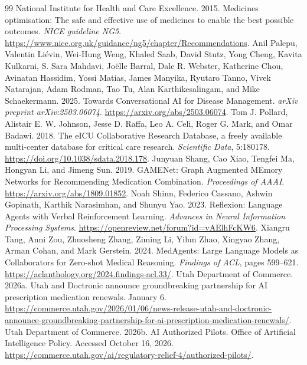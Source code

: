 \begin{thebibliography}{99}
 National Institute for Health and Care Excellence. 2015. Medicines optimisation: The safe and effective use of medicines to enable the best possible outcomes. \emph{NICE guideline NG5}. \url{https://www.nice.org.uk/guidance/ng5/chapter/Recommendations}.
 Anil Palepu, Valentin Li\'evin, Wei-Hung Weng, Khaled Saab, David Stutz, Yong Cheng, Kavita Kulkarni, S. Sara Mahdavi, Jo\"elle Barral, Dale R. Webster, Katherine Chou, Avinatan Hassidim, Yossi Matias, James Manyika, Ryutaro Tanno, Vivek Natarajan, Adam Rodman, Tao Tu, Alan Karthikesalingam, and Mike Schaekermann. 2025. Towards Conversational AI for Disease Management. \emph{arXiv preprint arXiv:2503.06074}. \url{https://arxiv.org/abs/2503.06074}.
 Tom J. Pollard, Alistair E. W. Johnson, Jesse D. Raffa, Leo A. Celi, Roger G. Mark, and Omar Badawi. 2018. The eICU Collaborative Research Database, a freely available multi-center database for critical care research. \emph{Scientific Data}, 5:180178. \url{https://doi.org/10.1038/sdata.2018.178}.
 Junyuan Shang, Cao Xiao, Tengfei Ma, Hongyan Li, and Jimeng Sun. 2019. GAMENet: Graph Augmented MEmory Networks for Recommending Medication Combination. \emph{Proceedings of AAAI}. \url{https://arxiv.org/abs/1809.01852}.
 Noah Shinn, Federico Cassano, Ashwin Gopinath, Karthik Narasimhan, and Shunyu Yao. 2023. Reflexion: Language Agents with Verbal Reinforcement Learning. \emph{Advances in Neural Information Processing Systems}. \url{https://openreview.net/forum?id=vAElhFcKW6}.
 Xiangru Tang, Anni Zou, Zhuosheng Zhang, Ziming Li, Yilun Zhao, Xingyao Zhang, Arman Cohan, and Mark Gerstein. 2024. MedAgents: Large Language Models as Collaborators for Zero-shot Medical Reasoning. \emph{Findings of ACL}, pages 599--621. \url{https://aclanthology.org/2024.findings-acl.33/}.
 Utah Department of Commerce. 2026a. Utah and Doctronic announce groundbreaking partnership for AI prescription medication renewals. January 6. \url{https://commerce.utah.gov/2026/01/06/news-release-utah-and-doctronic-announce-groundbreaking-partnership-for-ai-prescription-medication-renewals/}.
 Utah Department of Commerce. 2026b. AI Authorized Pilots. Office of Artificial Intelligence Policy. Accessed October 16, 2026. \url{https://commerce.utah.gov/ai/regulatory-relief-4/authorized-pilots/}.

\end{thebibliography}
